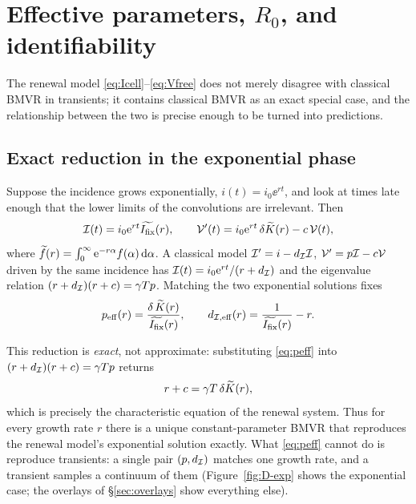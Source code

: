 
\section{Effective parameters, $R_0$, and identifiability}
\label{sec:peff-section}

The renewal model \eqref{eq:Icell}--\eqref{eq:Vfree} does not merely
disagree with classical BMVR in transients; it contains classical BMVR as an
exact special case, and the relationship between the two is precise enough
to be turned into predictions.

\subsection{Exact reduction in the exponential phase}

Suppose the incidence grows exponentially, $i(t)=i_0\ee^{rt}$, and look at
times late enough that the lower limits of the convolutions are irrelevant.
Then
\begin{equation}
\mathcal{I}(t)=i_0{\rm e}^{rt}\widetilde{I_{\mathrm{fix}}}(r),
\qquad
\mathcal{V}'(t)=i_0{\rm e}^{rt}\,\delta\widetilde{K}(r)-c\,\mathcal{V}(t),
\end{equation}
where $\widetilde{f}(r)=\int_0^\infty{\rm e}^{-r\alpha}f(\alpha)\,{\rm d}\alpha$. A
classical model $\mathcal{I}'=i-d_{\mathcal{I}}\mathcal{I}$, $\mathcal{V}'=p\mathcal{I}-c\mathcal{V}$
driven by the same incidence has $\mathcal{I}(t)=i_0{\rm e}^{rt}/(r+d_{\mathcal{I}})$ and
the eigenvalue relation $(r+d_{\mathcal{I}})(r+c)=\gamma Tp$. Matching the two
exponential solutions fixes
\begin{equation}
p_{\rm eff}(r)=\frac{\delta\,\widetilde{K}(r)}{\widetilde{I_{\mathrm{fix}}}(r)},
\qquad
d_{\mathcal{I},{\rm eff}}(r)=\frac{1}{\widetilde{I_{\mathrm{fix}}}(r)}-r.
\label{eq:peff}
\end{equation}

This reduction is \emph{exact}, not approximate: substituting
\eqref{eq:peff} into $(r+d_{\mathcal{I}})(r+c)=\gamma Tp$ returns
\begin{equation}
r+c=\gamma T\,\delta\widetilde{K}(r),
\label{eq:char}
\end{equation}
which is precisely the characteristic equation of the renewal system. Thus
for every growth rate $r$ there is a unique constant-parameter BMVR that
reproduces the renewal model's exponential solution exactly. What
\eqref{eq:peff} cannot do is reproduce transients: a single pair
$(p,d_{\mathcal{I}})$ matches one growth rate, and a transient samples a
continuum of them (Figure~\ref{fig:D-exp} shows the exponential case; the
overlays of \S\ref{sec:overlays} show everything else).

